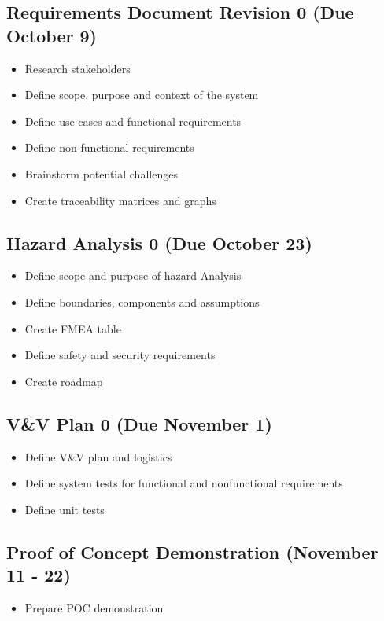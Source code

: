 \documentclass{article}
\begin{document}
	\subsection{Requirements Document Revision 0 (Due October 9)}
	\begin{itemize}
		\item Research stakeholders
		\item Define scope, purpose and context of the system
		\item Define use cases and functional requirements
		\item Define non-functional requirements
		\item Brainstorm potential challenges
		\item Create traceability matrices and graphs
	\end{itemize}

	\subsection{Hazard Analysis 0 (Due October 23)}
	\begin{itemize}
		\item Define scope and purpose of hazard Analysis
		\item Define boundaries, components and assumptions
		\item Create FMEA table
		\item Define safety and security requirements
		\item Create roadmap
	\end{itemize}

	\subsection{V\&V Plan 0 (Due November 1)}
	\begin{itemize}
		\item Define V\&V plan and logistics
		\item Define system tests for functional and nonfunctional requirements
		\item Define unit tests
	\end{itemize}

	\subsection{Proof of Concept Demonstration (November 11 - 22)}
	\begin{itemize}
		\item Prepare POC demonstration
	\end{itemize}
\end{document}
